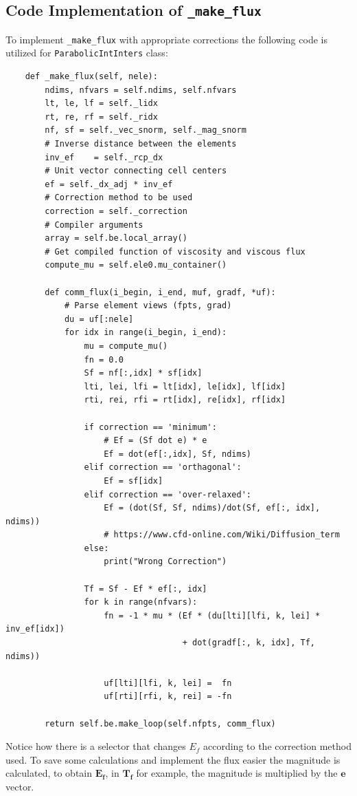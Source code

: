 \documentclass[a4paper, 12pt]{article}
\begin{document}
\subsection{Code Implementation of \texttt{\_make\_flux}}
To implement \verb|_make_flux| with appropriate corrections the following code is utilized for \verb|ParabolicIntInters| class:

\begin{verbatim}
    def _make_flux(self, nele):
        ndims, nfvars = self.ndims, self.nfvars
        lt, le, lf = self._lidx
        rt, re, rf = self._ridx
        nf, sf = self._vec_snorm, self._mag_snorm
        # Inverse distance between the elements
        inv_ef    = self._rcp_dx
        # Unit vector connecting cell centers 
        ef = self._dx_adj * inv_ef
        # Correction method to be used
        correction = self._correction
        # Compiler arguments
        array = self.be.local_array()
        # Get compiled function of viscosity and viscous flux
        compute_mu = self.ele0.mu_container()
        
        def comm_flux(i_begin, i_end, muf, gradf, *uf):
            # Parse element views (fpts, grad)
            du = uf[:nele]
            for idx in range(i_begin, i_end):
                mu = compute_mu()
                fn = 0.0
                Sf = nf[:,idx] * sf[idx]
                lti, lei, lfi = lt[idx], le[idx], lf[idx]
                rti, rei, rfi = rt[idx], re[idx], rf[idx]
                
                if correction == 'minimum':
                    # Ef = (Sf dot e) * e
                    Ef = dot(ef[:,idx], Sf, ndims)
                elif correction == 'orthagonal':
                    Ef = sf[idx]
                elif correction == 'over-relaxed':
                    Ef = (dot(Sf, Sf, ndims)/dot(Sf, ef[:, idx], ndims))
                    # https://www.cfd-online.com/Wiki/Diffusion_term 
                else:
                    print("Wrong Correction")
                    
                Tf = Sf - Ef * ef[:, idx]
                for k in range(nfvars):
                    fn = -1 * mu * (Ef * (du[lti][lfi, k, lei] * inv_ef[idx])
                                    + dot(gradf[:, k, idx], Tf, ndims))

                    uf[lti][lfi, k, lei] =  fn
                    uf[rti][rfi, k, rei] = -fn
                    
        return self.be.make_loop(self.nfpts, comm_flux)
\end{verbatim} 
\par
Notice how there is a selector that changes $E_f$ according to the correction method used. To save some calculations and implement the flux easier the magnitude is calculated, to obtain $\mathbf{E_f}$, in $\mathbf{T_f}$ for example, the magnitude is multiplied by the $\mathbf{e}$ vector. \\\par
\end{document}
